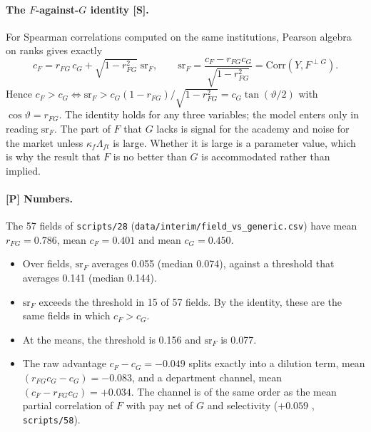 \paragraph{The $F$-against-$G$ identity [S].} For Spearman correlations computed on the same institutions,
Pearson algebra on ranks gives exactly
\[
c_F=r_{FG}\,c_G+\sqrt{1-r_{FG}^2}\;\mathrm{sr}_F,\qquad
\mathrm{sr}_F=\frac{c_F-r_{FG}c_G}{\sqrt{1-r_{FG}^2}}=\mathrm{Corr}(Y,F^{\perp G}) .
\]
Hence $c_F>c_G\iff\mathrm{sr}_F>c_G(1-r_{FG})/\sqrt{1-r_{FG}^2}=c_G\tan(\vartheta/2)$ with
$\cos\vartheta=r_{FG}$. The identity holds for any three variables; the model enters only in reading
$\mathrm{sr}_F$. The part of $F$ that $G$ lacks is signal for the academy and noise for the market unless
$\kappa_f\Lambda_{ft}$ is large. Whether it is large is a parameter value, which is why the result that $F$ is no
better than $G$ is accommodated rather than implied.

\paragraph{[P] Numbers.} The 57 fields of \texttt{scripts/28} (\texttt{data/interim/field\_vs\_generic.csv})
have mean $r_{FG}=0.786$, mean $c_F=0.401$ and mean $c_G=0.450$.
\begin{itemize}
\item Over fields, $\mathrm{sr}_F$ averages 0.055 (median 0.074), against a threshold that averages 0.141 (median
0.144).
\item $\mathrm{sr}_F$ exceeds the threshold in 15 of 57 fields. By the identity, these are the same fields in which
$c_F>c_G$.
\item At the means, the threshold is 0.156 and $\mathrm{sr}_F$ is 0.077.
\item The raw advantage $c_F-c_G=-0.049$ splits exactly into a dilution term, mean $(r_{FG}c_G-c_G)=-0.083$, and a
department channel, mean $(c_F-r_{FG}c_G)=+0.034$. The channel is of the same order as the mean partial
correlation of $F$ with pay net of $G$ and selectivity ($+0.059$ , \texttt{scripts/58}).
\end{itemize}

